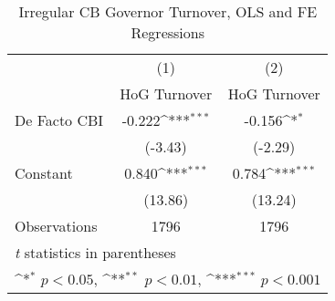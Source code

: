 \begin{table}[htbp]\centering
\def\sym#1{\ifmmode^{#1}\else\(^{#1}\)\fi}
\caption{Irregular CB Governor Turnover, OLS and FE Regressions \label{irregtdHOGalone}}
\begin{tabular}{l*{2}{c}}
\toprule
                                        &\multicolumn{1}{c}{(1)}&\multicolumn{1}{c}{(2)}\\
                                        &\multicolumn{1}{c}{HoG Turnover}&\multicolumn{1}{c}{HoG Turnover}\\
\midrule
De Facto CBI                            &   -0.222\sym{***}&   -0.156\sym{*}  \\
                                        &  (-3.43)         &  (-2.29)         \\
\addlinespace
Constant                                &    0.840\sym{***}&    0.784\sym{***}\\
                                        &  (13.86)         &  (13.24)         \\
\midrule
Observations                            &     1796         &     1796         \\
\bottomrule
\multicolumn{3}{l}{\footnotesize \textit{t} statistics in parentheses}\\
\multicolumn{3}{l}{\footnotesize \sym{*} \(p<0.05\), \sym{**} \(p<0.01\), \sym{***} \(p<0.001\)}\\
\end{tabular}
\end{table}
